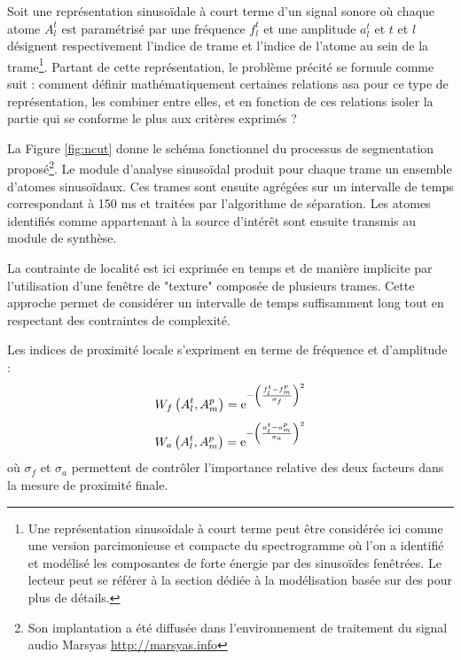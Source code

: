 Soit une représentation sinusoïdale à court terme d'un signal sonore où chaque atome $A_l^t$ est paramétrisé par une fréquence $f_l^t$ et une amplitude $a_l^t$ et $t$ et $l$ désignent respectivement l'indice de trame et l'indice de l'atome au sein de la trame\footnote{Une représentation sinusoïdale à court terme peut être considérée ici comme une version parcimonieuse et compacte du spectrogramme où l'on a identifié et modélisé les composantes de forte énergie par des sinusoïdes fenêtrées. Le lecteur peut se référer à la section dédiée à la modélisation basée sur des   pour plus de détails.}. Partant de cette représentation, le problème précité se formule comme suit : comment définir mathématiquement certaines relations asa pour ce type de représentation, les combiner entre elles, et en fonction de ces relations isoler la partie qui se conforme le plus aux critères exprimés ?

La Figure \ref{fig:ncut} donne le schéma fonctionnel du processus de segmentation proposé\footnote{Son implantation a été diffusée dans l'environnement de traitement du signal audio Marsyas \url{http://marsyas.info}}. Le module d'analyse sinusoïdal produit pour chaque trame un ensemble d'atomes sinusoïdaux. Ces trames sont ensuite agrégées sur un intervalle de temps correspondant à 150 ms et traitées par l'algorithme de séparation. Les atomes identifiés comme appartenant à la source d'intérêt sont ensuite transmis au module de synthèse.

La contrainte de localité est ici exprimée en temps et de manière implicite par l'utilisation d'une fenêtre de "texture" composée de plusieurs trames. Cette approche permet de considérer un intervalle de temps suffisamment long tout en respectant des contraintes de complexité.

Les indices de proximité locale s'expriment en terme de fréquence et d'amplitude :
\begin{equation}
  W_f \left( A _ { l } ^ {t} , A _ { m } ^ { p } \right) = \operatorname{e} ^ { - \left( \frac { f _ { l } ^ {t} - f _ { m } ^ { p } } { \sigma _ { f } } \right) ^ { 2 } }
\end{equation}
\begin{equation}
  W_a \left( A _ { l } ^ {t} , A _ { m } ^ { p } \right) = \operatorname{e} ^{ - \left( \frac { a _ { l } ^ {t} - a _ { m } ^ { p } } { \sigma _ { a } } \right) ^ { 2 } }
\end{equation}
où $\sigma _ { f }$ et $\sigma _ { a }$ permettent de contrôler l'importance relative des deux facteurs dans la mesure de proximité finale.

